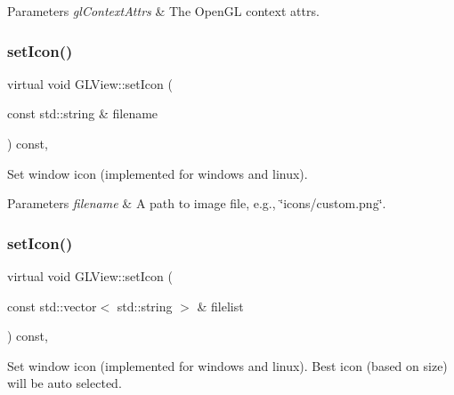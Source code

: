 \begin{DoxyParams}{Parameters}
{\em gl\+Context\+Attrs} & The Open\+GL context attrs. \\
\hline
\end{DoxyParams}
\mbox{\label{classGLView_a3f7af6e8ef7059255a6626c86ecce17e}} 
\subsubsection{\texorpdfstring{set\+Icon()}{setIcon()}\hspace{0.1cm}{\footnotesize\ttfamily [1/2]}}
{\footnotesize\ttfamily virtual void G\+L\+View\+::set\+Icon (\begin{DoxyParamCaption}\item[{const std\+::string \&}]{filename }\end{DoxyParamCaption}) const\hspace{0.3cm}{\ttfamily [inline]}, {\ttfamily [virtual]}}

Set window icon (implemented for windows and linux).


\begin{DoxyParams}{Parameters}
{\em filename} & A path to image file, e.\+g., \char`\"{}icons/custom.\+png\char`\"{}. \\
\hline
\end{DoxyParams}
\mbox{\label{classGLView_a35b469df944ab7e768e20dc1803154fe}} 
\subsubsection{\texorpdfstring{set\+Icon()}{setIcon()}\hspace{0.1cm}{\footnotesize\ttfamily [2/2]}}
{\footnotesize\ttfamily virtual void G\+L\+View\+::set\+Icon (\begin{DoxyParamCaption}\item[{const std\+::vector$<$ std\+::string $>$ \&}]{filelist }\end{DoxyParamCaption}) const\hspace{0.3cm}{\ttfamily [inline]}, {\ttfamily [virtual]}}

Set window icon (implemented for windows and linux). Best icon (based on size) will be auto selected.


